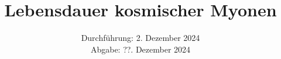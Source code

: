

\subject{\texorpdfstring{\vspace{2ex}}{}V01\texorpdfstring{\vspace{-2ex}}{}} %
\title{Lebensdauer kosmischer Myonen} %
\date{
	Durchführung: 2. Dezember 2024 %
	\\ Abgabe: ??. Dezember 2024 %
}





\maketitle
\thispagestyle{empty}

\tableofcontents
\newpage








\printbibliography{}

\newpage



